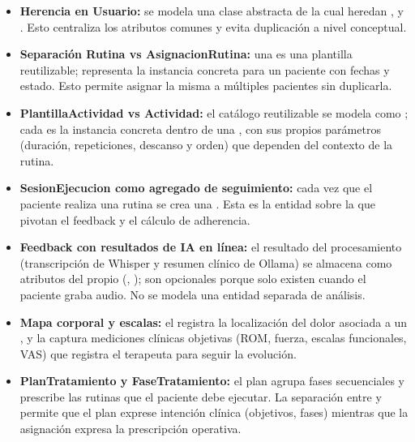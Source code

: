 \begin{itemize}
  \item \textbf{Herencia en Usuario:} se modela una clase abstracta  de la cual heredan ,  y . Esto centraliza los atributos comunes y evita duplicación a nivel conceptual.

  \item \textbf{Separación Rutina vs AsignacionRutina:} una  es una plantilla reutilizable;  representa la instancia concreta para un paciente con fechas y estado. Esto permite asignar la misma  a múltiples pacientes sin duplicarla.

  \item \textbf{PlantillaActividad vs Actividad:} el catálogo reutilizable se modela como ; cada  es la instancia concreta dentro de una , con sus propios parámetros (duración, repeticiones, descanso y orden) que dependen del contexto de la rutina.

  \item \textbf{SesionEjecucion como agregado de seguimiento:} cada vez que el paciente realiza una rutina se crea una . Esta es la entidad sobre la que pivotan el feedback y el cálculo de adherencia.

  \item \textbf{Feedback con resultados de IA en línea:} el resultado del procesamiento (transcripción de Whisper y resumen clínico de Ollama) se almacena como atributos del propio  (, ); son opcionales porque solo existen cuando el paciente graba audio. No se modela una entidad separada de análisis.

  \item \textbf{Mapa corporal y escalas:} el  registra la localización del dolor asociada a un , y la  captura mediciones clínicas objetivas (ROM, fuerza, escalas funcionales, VAS) que registra el terapeuta para seguir la evolución.

  \item \textbf{PlanTratamiento y FaseTratamiento:} el plan agrupa fases secuenciales y prescribe las rutinas que el paciente debe ejecutar. La separación entre  y  permite que el plan exprese intención clínica (objetivos, fases) mientras que la asignación expresa la prescripción operativa.


\end{itemize}
